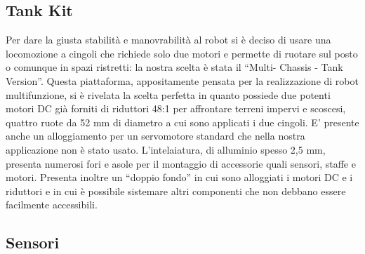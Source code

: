 \subsection {Tank Kit}
Per dare la giusta stabilità e manovrabilità al robot si è deciso di usare una
 locomozione a cingoli che richiede solo due motori e permette di ruotare sul 
 posto o comunque in spazi ristretti: la nostra scelta è stata il ``Multi-
 Chassis - Tank Version''. Questa piattaforma, appositamente pensata per la 
 realizzazione di robot multifunzione, si è rivelata la scelta perfetta in 
 quanto possiede due potenti motori DC già forniti di riduttori 48:1 per 
 affrontare terreni impervi e scoscesi, quattro ruote da 52 mm di diametro a 
 cui sono applicati i due cingoli. E' presente anche un alloggiamento per un 
 servomotore standard che nella nostra applicazione non è stato usato. 
 L'intelaiatura, di alluminio spesso 2,5 mm, presenta numerosi fori e asole
  per il montaggio di accessorie quali sensori, staffe e motori. Presenta
  inoltre un ``doppio fondo'' in cui sono alloggiati i motori DC e i riduttori 
  e in cui è possibile sistemare altri componenti che non debbano essere 
  facilmente accessibili.
\subsection {Sensori}
